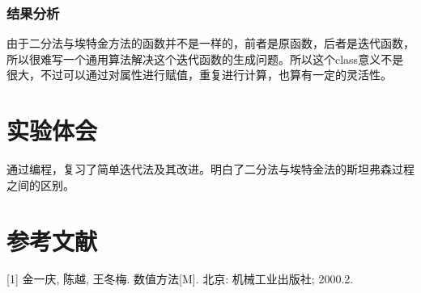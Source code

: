\subsubsection{结果分析}

由于二分法与埃特金方法的函数并不是一样的，前者是原函数，后者是迭代函数，所以很难写一个通用算法解决这个迭代函数的生成问题。所以这个class意义不是很大，不过可以通过对属性进行赋值，重复进行计算，也算有一定的灵活性。

\section{实验体会}

通过编程，复习了简单迭代法及其改进。明白了二分法与埃特金法的斯坦弗森过程之间的区别。

\section{参考文献}

[1] 金一庆, 陈越, 王冬梅. 数值方法[M]. 北京: 机械工业出版社; 2000.2.
